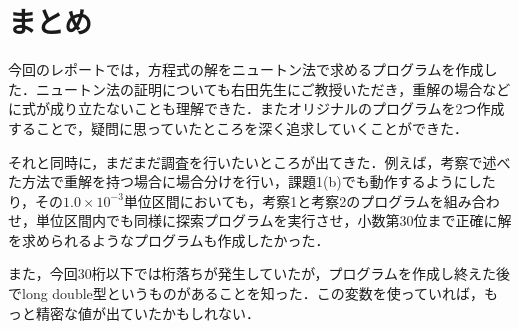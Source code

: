 \documentclass[12pt]{jarticle}
\renewcommand  \[  {\begin{eqnarray}}
\renewcommand  \]  {\end{eqnarray}}
\begin{document}
\section{まとめ}

今回のレポートでは，方程式の解をニュートン法で求めるプログラムを作成した．ニュートン法の証明についても右田先生にご教授いただき，重解の場合などに式が成り立たないことも理解できた．またオリジナルのプログラムを2つ作成することで，疑問に思っていたところを深く追求していくことができた．

それと同時に，まだまだ調査を行いたいところが出てきた．例えば，考察で述べた方法で重解を持つ場合に場合分けを行い，課題1(b)でも動作するようにしたり，その$1.0 \times 10^{-3}$単位区間においても，考察1と考察2のプログラムを組み合わせ，単位区間内でも同様に探索プログラムを実行させ，小数第30位まで正確に解を求められるようなプログラムも作成したかった．

また，今回30桁以下では桁落ちが発生していたが，プログラムを作成し終えた後でlong double型というものがあることを知った．この変数を使っていれば，もっと精密な値が出ていたかもしれない．
















































\end{document}
